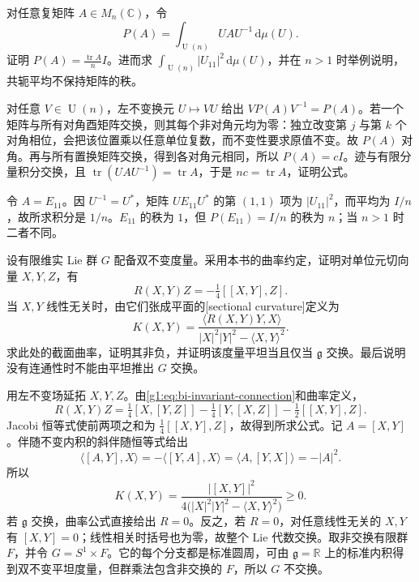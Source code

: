 \BookExercises

\begin{exercise}\label{g1:ex:unitary-conjugation-average}
	对任意复矩阵 \(A\in M_n(\mathbb C)\)，令
	\[
		P(A)=\int_{\operatorname{U}(n)}UAU^{-1}\,\mathrm{d}\mu(U).
	\]
	证明 \(P(A)=\frac{\operatorname{tr}A}{n}I\)。进而求 \(\int_{\operatorname{U}(n)}|U_{11}|^2\,\mathrm{d}\mu(U)\)，并在 \(n>1\) 时举例说明，共轭平均不保持矩阵的秩。
\end{exercise}
\begin{solution}
	对任意 \(V\in\operatorname{U}(n)\)，左不变换元 \(U\mapsto VU\) 给出 \(VP(A)V^{-1}=P(A)\)。若一个矩阵与所有对角酉矩阵交换，则其每个非对角元均为零：独立改变第 \(j\) 与第 \(k\) 个对角相位，会把该位置乘以任意单位复数，而不变性要求原值不变。故 \(P(A)\) 对角。再与所有置换矩阵交换，得到各对角元相同，所以 \(P(A)=cI\)。迹与有限分量积分交换，且 \(\operatorname{tr}(UAU^{-1})=\operatorname{tr}A\)，于是 \(nc=\operatorname{tr}A\)，证明公式。

	令 \(A=E_{11}\)。因 \(U^{-1}=U^*\)，矩阵 \(UE_{11}U^*\) 的第 \((1,1)\) 项为 \(|U_{11}|^2\)，而平均为 \(I/n\)，故所求积分是 \(1/n\)。\(E_{11}\) 的秩为 \(1\)，但 \(P(E_{11})=I/n\) 的秩为 \(n\)；当 \(n>1\) 时二者不同。
\end{solution}

\begin{exercise}\label{g1:ex:bi-invariant-curvature}
	设有限维实 Lie 群 \(G\) 配备双不变度量。采用本书的曲率约定，证明对单位元切向量 \(X,Y,Z\)，有
	\[
		R(X,Y)Z=-\tfrac14[[X,Y],Z].
	\]
	当 \(X,Y\) 线性无关时，由它们张成平面的[sectional curvature]定义为
	\[
		K(X,Y)=\frac{\langle R(X,Y)Y,X\rangle}{|X|^2|Y|^2-\langle X,Y\rangle^2}.
	\]
	求此处的截面曲率，证明其非负，并证明该度量平坦当且仅当 \(\mathfrak g\) 交换。最后说明没有连通性时不能由平坦推出 \(G\) 交换。
\end{exercise}
\begin{solution}
	用左不变场延拓 \(X,Y,Z\)。由\eqref{g1:eq:bi-invariant-connection}和曲率定义，
	\[
		R(X,Y)Z
		=\tfrac14[X,[Y,Z]]-\tfrac14[Y,[X,Z]]-\tfrac12[[X,Y],Z].
	\]
	Jacobi 恒等式使前两项之和为 \(\tfrac14[[X,Y],Z]\)，故得到所求公式。记 \(A=[X,Y]\)。伴随不变内积的斜伴随恒等式给出
	\[
		\langle[A,Y],X\rangle
		=-\langle[Y,A],X\rangle
		=\langle A,[Y,X]\rangle=-|A|^2.
	\]
	所以
	\[
		K(X,Y)=\frac{|[X,Y]|^2}
		{4\bigl(|X|^2|Y|^2-\langle X,Y\rangle^2\bigr)}\ge0.
	\]
	若 \(\mathfrak g\) 交换，曲率公式直接给出 \(R=0\)。反之，若 \(R=0\)，对任意线性无关的 \(X,Y\) 有 \([X,Y]=0\)；线性相关时括号也为零，故整个 Lie 代数交换。取非交换有限群 \(F\)，并令 \(G=S^1\times F\)。它的每个分支都是标准圆周，可由 \(\mathfrak g=\mathbb R\) 上的标准内积得到双不变平坦度量，但群乘法包含非交换的 \(F\)，所以 \(G\) 不交换。
\end{solution}

